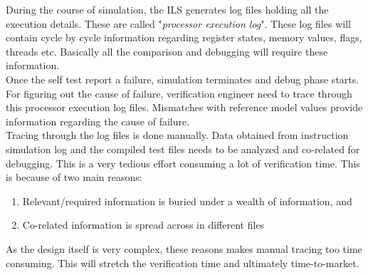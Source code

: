 During the course of simulation, the ILS generates log files holding all the execution details. These are called "\emph {processor execution log}". These log files will contain cycle by cycle information regarding register states, memory values, flags, threads etc. Basically all the comparison and debugging will require these information.\\

Once the self test report a failure, simulation terminates and debug phase starts. For figuring out the cause of failure, verification engineer need to trace through this processor execution log files. Mismatches with reference model values provide information regarding the cause of failure. \\

Tracing through the log files is done manually. Data obtained from instruction simulation log and the compiled test files needs to be analyzed and co-related for debugging. This is a very tedious effort consuming a lot of verification time. This is because of two main reasons:

\begin{enumerate}
	\item Relevant/required information is buried under a wealth of information, and
	\item Co-related information is spread across in different files
\end{enumerate}

As the design itself is very complex, these reasons makes manual tracing too time consuming. This will stretch the verification time and ultimately time-to-market.   


